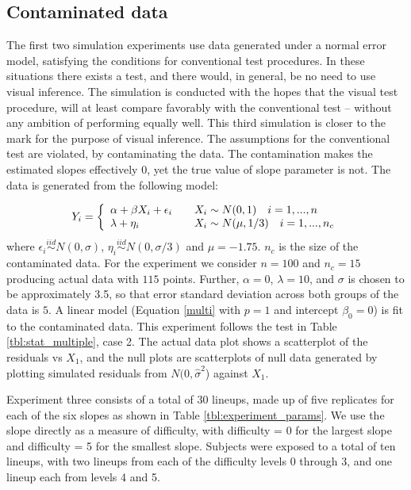 \documentclass[12pt]{article}
\begin{document}
\subsection{Contaminated data} \label{sec:contamination}

The first two simulation experiments use data generated under a normal error model, satisfying the conditions for conventional test procedures. In these situations there exists a test, and there would, in general, be no need to use visual inference. The simulation is conducted with the hopes that the visual test procedure,  will at least compare favorably with the conventional test -- without any ambition of performing equally well.
 This third simulation is closer to the mark for the purpose of visual inference. The assumptions for the conventional test are violated, by contaminating the data. The contamination makes the estimated slopes effectively 0, yet the true value of slope parameter is not.  The data is generated from the following model:

\[
  Y_i = \left\{
  \begin{array}{l l}
    \alpha+\beta X_i + \epsilon_i  & \quad  X_i \sim N(0,1) \quad  i =1,...,n\\
    \lambda+ \eta_i & \quad X_i \sim N(\mu,1/3) \quad  i=1, ...,n_c\\
  \end{array} \right.
\]
where $\epsilon_i \stackrel{iid}\sim N(0,\sigma)$, $\eta_i \stackrel{iid}\sim N(0,\sigma/3)$ and $\mu = -1.75$. $n_c$ is the size of the contaminated data. For the experiment we consider $n=100$ and $n_c=15$ producing actual data with $115$ points. Further, $\alpha=0$, $\lambda=10$, and $\sigma$ is chosen to be approximately 3.5, so that error standard deviation across both groups of the data is $5$. %
A linear model (Equation \ref{multi} with $p=1$  and intercept $\beta_0=0$) is fit to the contaminated data. This experiment  follows the test in Table \ref{tbl:stat_multiple}, case 2. The actual data plot shows a scatterplot of the residuals vs $X_1$, and the null  plots are scatterplots of null data generated by plotting simulated residuals from $N(0, {\hat{\sigma}}^2$)  against $X_1$. 

Experiment three consists of a total of 30 lineups, made up of five replicates for each of the six slopes as shown in Table \ref{tbl:experiment_params}. We use the slope directly as a measure of difficulty, with difficulty = 0 for the largest slope and difficulty = 5 for the smallest slope.  Subjects were exposed to a total of ten lineups, with two lineups from each of the difficulty levels 0 through 3, and one  lineup each from levels 4 and 5.
\end{document}
